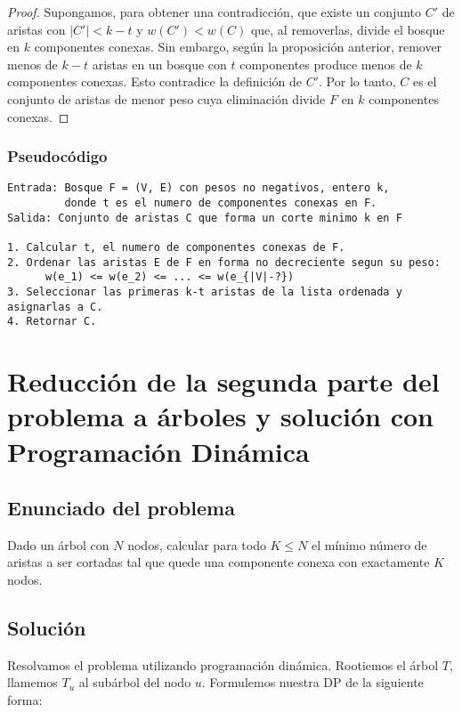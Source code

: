 \documentclass[a4paper, 12pt]{article}
\begin{document}
\begin{proof}
Supongamos, para obtener una contradicción, que existe un conjunto \( C' \) de aristas con \( |C'| < k-t \) y \( w(C') < w(C) \) que, al removerlas, divide el bosque en \( k \) componentes conexas.  
Sin embargo, según la proposición anterior, remover menos de \( k-t \) aristas en un bosque con \( t \) componentes produce menos de \( k \) componentes conexas.  
Esto contradice la definición de $C'$.  
Por lo tanto, \( C \) es el conjunto de aristas de menor peso cuya eliminación divide \( F \) en \( k \) componentes conexas.
\end{proof}


\subsubsection{Pseudocódigo}

\begin{lstlisting}
Entrada: Bosque F = (V, E) con pesos no negativos, entero k, 
         donde t es el numero de componentes conexas en F.
Salida: Conjunto de aristas C que forma un corte minimo k en F

1. Calcular t, el numero de componentes conexas de F.
2. Ordenar las aristas E de F en forma no decreciente segun su peso:
      w(e_1) <= w(e_2) <= ... <= w(e_{|V|-?})
3. Seleccionar las primeras k-t aristas de la lista ordenada y asignarlas a C.
4. Retornar C.
\end{lstlisting}


\section{Reducción de la segunda parte del problema a árboles y solución con Programación Dinámica}

\subsection{Enunciado del problema}

Dado un árbol con $N$ nodos, calcular para todo $K \leq N$ el mínimo número de aristas a ser
cortadas tal que quede una componente conexa con exactamente $K$ nodos. 

\subsection{Solución}

Resolvamos el problema utilizando programación dinámica. Rootiemos el árbol $T$, llamemos $T_u$ al subárbol del nodo $u$.
Formulemos nuestra DP de la siguiente forma: 
\end{document}
